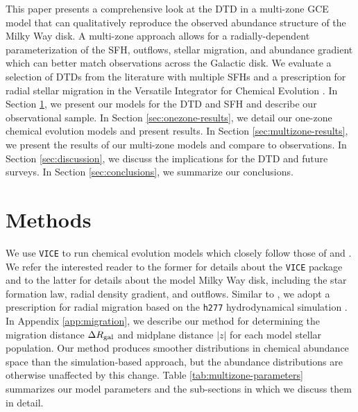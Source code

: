 \documentclass[twocolumn,twocolappendix,linenumbers]{aastex631}
\newcommand{\vice}{{\tt VICE}\xspace}
\newcommand{\hydro}{{\tt h277}\xspace}
\begin{document}
This paper presents a comprehensive look at the DTD in a multi-zone GCE model that can qualitatively reproduce the observed abundance structure of the Milky Way disk. A multi-zone approach allows for a radially-dependent parameterization of the SFH, outflows, stellar migration, and abundance gradient which can better match observations across the Galactic disk. We evaluate a selection of DTDs from the literature with multiple SFHs and a prescription for radial stellar migration in the Versatile Integrator for Chemical Evolution \citep[\vice;][]{JohnsonWeinberg2020-Starbursts}. In Section \ref{sec:methods}, we present our models for the DTD and SFH and describe our observational sample. In Section \ref{sec:onezone-results}, we detail our one-zone chemical evolution models and present results. In Section \ref{sec:multizone-results}, we present the results of our multi-zone models and compare to observations. In Section \ref{sec:discussion}, we discuss the implications for the DTD and future surveys. In Section \ref{sec:conclusions}, we summarize our conclusions.

\section{Methods}
\label{sec:methods}

We use \vice to run chemical evolution models which closely follow those of \citet{JohnsonWeinberg2020-Starbursts} and \citet[][hereafter ]{Johnson2021-Migration}. We refer the interested reader to the former for details about the \vice package and to the latter for details about the model Milky Way disk, including the star formation law, radial density gradient, and outflows. Similar to , we adopt a prescription for radial migration based on the \hydro hydrodynamical simulation \citep{Christensen2012-h277}. In Appendix \ref{app:migration}, we describe our method for determining the migration distance $\Delta R_{\rm gal}$ and midplane distance $|z|$ for each model stellar population. Our method produces smoother distributions in chemical abundance space than the simulation-based approach, but the abundance distributions are otherwise unaffected by this change. Table \ref{tab:multizone-parameters} summarizes our model parameters and the sub-sections in which we discuss them in detail.
\end{document}
